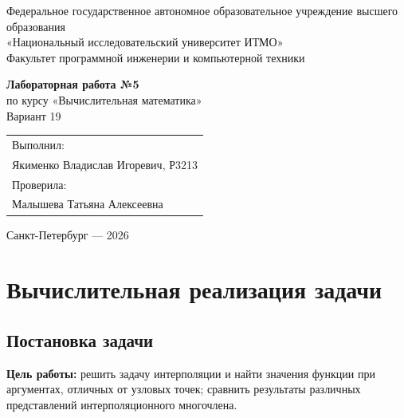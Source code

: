\documentclass[12pt,a4paper]{article}
\begin{document}
\hypersetup{pageanchor=false}
\begin{titlepage}
  \thispagestyle{empty}
  \begin{center}
    {\small Федеральное государственное автономное образовательное учреждение высшего образования\\
    «Национальный исследовательский университет ИТМО»}\\[0.8em]
    {\small Факультет программной инженерии и компьютерной техники}

    \vfill

    {\Large\textbf{Лабораторная работа №5}}\\[0.6em]
    {\large по курсу «Вычислительная математика»}\\[0.6em]
    {\large Вариант 19}

    \vfill

    \begin{flushright}
      \begin{tabular}{l}
        Выполнил:\\
        Якименко Владислав Игоревич, Р3213\\[0.8em]
        Проверила:\\
        Малышева Татьяна Алексеевна
      \end{tabular}
    \end{flushright}

    \vfill

    Санкт-Петербург --- 2026
  \end{center}
\end{titlepage}
\clearpage
\hypersetup{pageanchor=true}

\tableofcontents
\thispagestyle{empty}
\clearpage
{}


\section{Вычислительная реализация задачи}
\subsection{Постановка задачи}
\textbf{Цель работы:} решить задачу интерполяции и найти значения функции
при аргументах, отличных от узловых точек; сравнить результаты различных
представлений интерполяционного многочлена.
\end{document}

